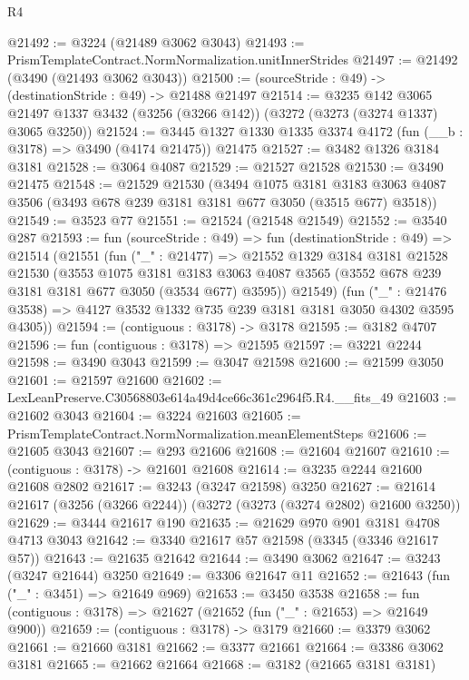 \begin{lexlean}{R4}
\begin{coremodule}
@21492 := @3224 (@21489 @3062 @3043)
@21493 := PrismTemplateContract.NormNormalization.unitInnerStrides
@21497 := @21492 (@3490 (@21493 @3062 @3043))
@21500 := (sourceStride : @49) -> (destinationStride : @49) -> @21488 @21497
@21514 := @3235
    @142
    @3065
    @21497
    @1337
    @3432
    (@3256 (@3266 @142))
    (@3272 (@3273 (@3274 @1337) @3065 @3250))
@21524 := @3445 @1327 @1330 @1335 @3374 @4172 (fun (__b : @3178) => @3490 (@4174 @21475)) @21475
@21527 := @3482 @1326 @3184 @3181
@21528 := @3064 @4087
@21529 := @21527 @21528
@21530 := @3490 @21475
@21548 := @21529
    @21530
    (@3494
      @1075
      @3181
      @3183
      @3063
      @4087
      @3506
      (@3493 @678 @239 @3181 @3181 @677 @3050 (@3515 @677) @3518))
@21549 := @3523 @77
@21551 := @21524 (@21548 @21549)
@21552 := @3540 @287
@21593 := fun (sourceStride : @49) =>
  fun (destinationStride : @49) =>
  @21514
    (@21551
      (fun ("_" : @21477) =>
      @21552
        @1329
        @3184
        @3181
        @21528
        @21530
        (@3553
          @1075
          @3181
          @3183
          @3063
          @4087
          @3565
          (@3552 @678 @239 @3181 @3181 @677 @3050 (@3534 @677) @3595))
        @21549)
      (fun ("_" : @21476 @3538) => @4127 @3532 @1332 @735 @239 @3181 @3181 @3050 @4302 @3595 @4305))
@21594 := (contiguous : @3178) -> @3178
@21595 := @3182 @4707
@21596 := fun (contiguous : @3178) => @21595
@21597 := @3221 @2244
@21598 := @3490 @3043
@21599 := @3047 @21598
@21600 := @21599 @3050
@21601 := @21597 @21600
@21602 := LexLeanPreserve.C30568803e614a49d4ce66c361c2964f5.R4.__fits_49
@21603 := @21602 @3043
@21604 := @3224 @21603
@21605 := PrismTemplateContract.NormNormalization.meanElementSteps
@21606 := @21605 @3043
@21607 := @293 @21606
@21608 := @21604 @21607
@21610 := (contiguous : @3178) -> @21601 @21608
@21614 := @3235 @2244 @21600 @21608 @2802
@21617 := @3243 (@3247 @21598) @3250
@21627 := @21614 @21617 (@3256 (@3266 @2244)) (@3272 (@3273 (@3274 @2802) @21600 @3250))
@21629 := @3444 @21617 @190
@21635 := @21629 @970 @901 @3181 @4708 @4713 @3043
@21642 := @3340 @21617 @57 @21598 (@3345 (@3346 @21617 @57))
@21643 := @21635 @21642
@21644 := @3490 @3062
@21647 := @3243 (@3247 @21644) @3250
@21649 := @3306 @21647 @11
@21652 := @21643 (fun ("_" : @3451) => @21649 @969)
@21653 := @3450 @3538
@21658 := fun (contiguous : @3178) => @21627 (@21652 (fun ("_" : @21653) => @21649 @900))
@21659 := (contiguous : @3178) -> @3179
@21660 := @3379 @3062
@21661 := @21660 @3181
@21662 := @3377 @21661
@21664 := @3386 @3062 @3181
@21665 := @21662 @21664
@21668 := @3182 (@21665 @3181 @3181)

\end{coremodule}
\end{lexlean}
